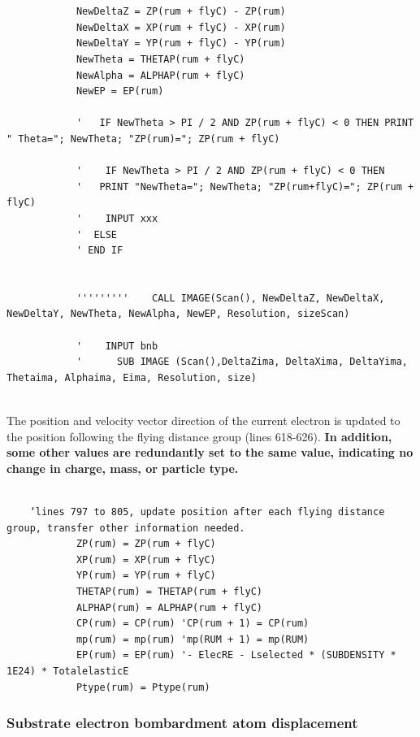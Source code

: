 \documentclass[10pt, reqno]{exam}
\begin{document}
\begin{verbatim}
    
    
            NewDeltaZ = ZP(rum + flyC) - ZP(rum)
            NewDeltaX = XP(rum + flyC) - XP(rum)
            NewDeltaY = YP(rum + flyC) - YP(rum)
            NewTheta = THETAP(rum + flyC)
            NewAlpha = ALPHAP(rum + flyC)
            NewEP = EP(rum)
    
            '   IF NewTheta > PI / 2 AND ZP(rum + flyC) < 0 THEN PRINT " Theta="; NewTheta; "ZP(rum)="; ZP(rum + flyC)
    
            '    IF NewTheta > PI / 2 AND ZP(rum + flyC) < 0 THEN
            '   PRINT "NewTheta="; NewTheta; "ZP(rum+flyC)="; ZP(rum + flyC)
            '    INPUT xxx
            '  ELSE
            ' END IF
    
    
            '''''''''    CALL IMAGE(Scan(), NewDeltaZ, NewDeltaX, NewDeltaY, NewTheta, NewAlpha, NewEP, Resolution, sizeScan)
    
            '    INPUT bnb
            '      SUB IMAGE (Scan(),DeltaZima, DeltaXima, DeltaYima, Thetaima, Alphaima, Eima, Resolution, size)
    
\end{verbatim}

The position and velocity vector direction of the current electron is updated to the position following the flying distance group (lines 618-626). \textbf{In addition, some other values are redundantly set to the same value, indicating no change in charge, mass, or particle type.} 

\begin{verbatim}
            
    ‘lines 797 to 805, update position after each flying distance group, transfer other information needed.  
            ZP(rum) = ZP(rum + flyC)
            XP(rum) = XP(rum + flyC)
            YP(rum) = YP(rum + flyC)
            THETAP(rum) = THETAP(rum + flyC)
            ALPHAP(rum) = ALPHAP(rum + flyC)
            CP(rum) = CP(rum) 'CP(rum + 1) = CP(rum)
            mp(rum) = mp(rum) 'mp(RUM + 1) = mp(RUM)
            EP(rum) = EP(rum) '- ElecRE - Lselected * (SUBDENSITY * 1E24) * TotalelasticE
            Ptype(rum) = Ptype(rum)
\end{verbatim}

\subsubsection{Substrate electron bombardment atom displacement}
\label{sec:substrate displacement}
\end{document}
